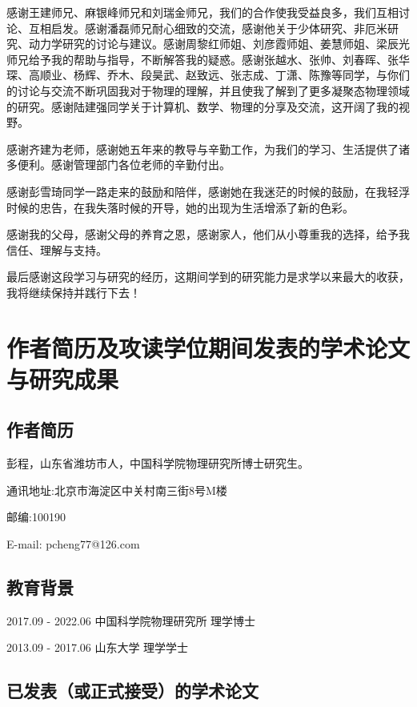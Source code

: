 感谢王建师兄、麻银峰师兄和刘瑞金师兄，我们的合作使我受益良多，我们互相讨论、互相启发。感谢潘磊师兄耐心细致的交流，感谢他关于少体研究、非厄米研究、动力学研究的讨论与建议。感谢周黎红师姐、刘彦霞师姐、姜慧师姐、梁辰光师兄给予我的帮助与指导，不断解答我的疑惑。感谢张越水、张帅、刘春晖、张华琛、高顺业、杨辉、乔木、段昊武、赵致远、张志成、丁潇、陈豫等同学，与你们的讨论与交流不断巩固我对于物理的理解，并且使我了解到了更多凝聚态物理领域的研究。感谢陆建强同学关于计算机、数学、物理的分享及交流，这开阔了我的视野。

感谢齐建为老师，感谢她五年来的教导与辛勤工作，为我们的学习、生活提供了诸多便利。感谢管理部门各位老师的辛勤付出。

感谢彭雪琦同学一路走来的鼓励和陪伴，感谢她在我迷茫的时候的鼓励，在我轻浮时候的忠告，在我失落时候的开导，她的出现为生活增添了新的色彩。

感谢我的父母，感谢父母的养育之恩，感谢家人，他们从小尊重我的选择，给予我信任、理解与支持。

最后感谢这段学习与研究的经历，这期间学到的研究能力是求学以来最大的收获，我将继续保持并践行下去！





\chapter{作者简历及攻读学位期间发表的学术论文与研究成果}


\section*{作者简历}

彭程，山东省潍坊市人，中国科学院物理研究所博士研究生。

通讯地址:北京市海淀区中关村南三街8号M楼 

邮编:100190

E-mail: pcheng77@126.com

\section*{教育背景}

2017.09 - 2022.06 中国科学院物理研究所 理学博士

2013.09 - 2017.06 山东大学 理学学士

\section*{已发表（或正式接受）的学术论文}

